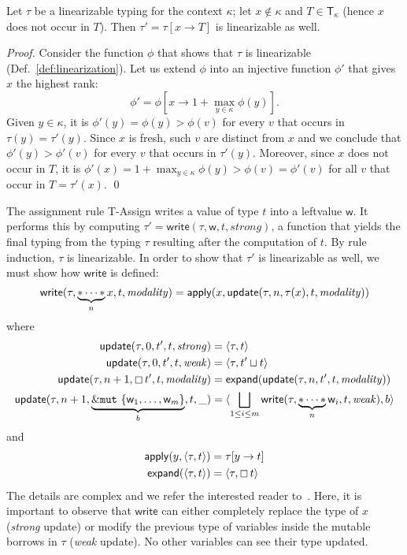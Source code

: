\begin{lemma}\label{lem:declare_invariant}
  Let $\tau$ be a linearizable typing for the context $\kappa$;
  let $x\not\in\kappa$ and $T\in\mathsf{T}_\kappa$ (hence $x$ does not occur in $T$).
  Then $\tau'=\tau[x\to T]$ is linearizable as well.
\end{lemma}
\begin{proof}
  Consider the function $\phi$ that shows that $\tau$ is linearizable (Def.~\ref{def:linearization}).
  Let us extend $\phi$ into an injective function $\phi'$ that gives $x$ the highest rank:
  \[
  \phi'=\phi\left[x\to 1+\max\limits_{y\in\kappa}\phi(y)\right].
  \]
  Given $y\in\kappa$, it is $\phi'(y)=\phi(y)>\phi(v)$ for every $v$ that occurs
  in $\tau(y)=\tau'(y)$. Since $x$ is fresh, such $v$ are distinct from $x$ and we
  conclude that $\phi'(y)>\phi'(v)$ for every $v$ that occurs in $\tau'(y)$.
  Moreover, since $x$ does not occur in $T$, it is
  $\phi'(x)=1+\max_{y\in\kappa}\phi(y)>\phi(v)=\phi'(v)$ for all $v$ that occur in $T=\tau'(x)$.
  \qed
\end{proof}

The assignment rule \textsf{T-Assign} writes a value of type $t$ into a leftvalue $\mathsf{w}$.
It performs this by computing $\tau'=\mathsf{write}(\tau,\mathsf{w},t,\mathit{strong})$,
a function that yields the final typing from the typing $\tau$ resulting after the computation of $t$.
By rule induction, $\tau$ is linearizable. In order to show that $\tau'$ is linearizable as well,
we must show how $\mathsf{write}$ is defined:
\[
\mathsf{write}(\tau,\underbrace{\mathtt{*}\cdots\mathtt{*}}_nx,t,\mathit{modality})=\mathsf{apply}
(x,\mathsf{update}(\tau,n,\tau(x),t,\mathit{modality}))
\]
where
\begin{align*}
  \mathsf{update}(\tau,0,t',t,\mathit{strong})&=\langle\tau,t\rangle\\
  \mathsf{update}(\tau,0,t',t,\mathit{weak})&=\langle\tau,t'\sqcup t\rangle\\
  \mathsf{update}(\tau,n+1,\boxempty\,{t'},t,\mathit{modality})
  &=\mathsf{expand}(\mathsf{update}(\tau,n,t',t,\mathit{modality}))\\
  \mathsf{update}(\tau,n+1,\underbrace{\&\mathtt{mut}\ \{\mathsf{w}_1,\ldots,\mathsf{w}_m\}}_b,t,\_)&=
    \langle\bigsqcup\limits_{1\le i\le m}\mathsf{write}(\tau,\underbrace{\mathtt{*}\cdots\mathtt{*}}_n\mathsf{w}_i,t,\mathit{weak}),b\rangle
\end{align*}
and
\begin{align*}
  \mathsf{apply}(y,\langle\tau,t\rangle)&=\tau[y\to t]\\
  \mathsf{expand}(\langle\tau,t\rangle)&=\langle\tau,\boxempty\,{t}\rangle
\end{align*}
%
The details are complex and we refer the interested reader to~\cite{Pearce21}.
Here, it is important to observe that $\mathsf{write}$
can either completely replace the type of $x$
(\emph{strong} update) or modify the previous type of variables
inside the mutable borrows in $\tau$ (\emph{weak} update).
No other variables can see their type updated.

